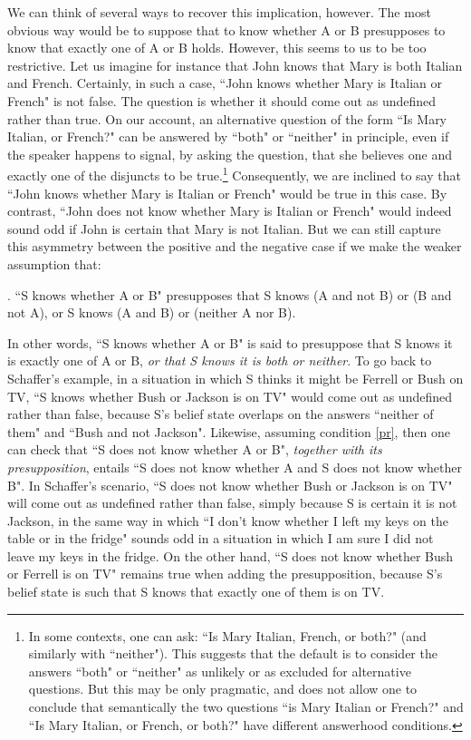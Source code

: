 We can think of several ways to recover this implication, however.
The most obvious way would be to suppose that to know whether A or
B presupposes to know that exactly one of A or B holds. However,
this seems to us to be too restrictive. Let us imagine for
instance that John knows that Mary is both Italian and French.
Certainly, in such a case, ``John knows whether Mary is Italian or
French" is not false. The question is whether it should come out
as undefined rather than true. On our account, an alternative
question of the form ``Is Mary Italian, or French?" can be
answered by ``both" or ``neither" in principle, even if the
speaker happens to signal, by asking the question, that she
believes one and exactly one of the disjuncts to be
true.\footnote{In some contexts, one can ask: ``Is Mary Italian,
French, or both?" (and similarly with ``neither"). This suggests
that the default is to consider the answers ``both" or ``neither"
as unlikely or as excluded for alternative questions. But this may
be only pragmatic, and does not allow one to conclude that
semantically the two questions ``is Mary Italian or French?" and
``Is Mary Italian, or French, or both?" have different answerhood
conditions.} Consequently, we are inclined to say that ``John
knows whether Mary is Italian or French" would be true in this
case. By contrast, ``John does not know whether Mary is Italian or
French" would indeed sound odd if John is certain that Mary is not
Italian. But we can still capture this asymmetry between the
positive and the negative case if we make the weaker assumption
that:

\ex.\label{pr} ``S knows whether A or B" presupposes that S knows
(A and not B) or (B and not A), or S knows (A and B) or (neither A
nor B).

In other words, ``S knows whether A or B" is said to presuppose
that S knows it is exactly one of A or B, \emph{or that S knows it
is both or neither}. To go back to Schaffer's example, in a
situation in which S thinks it might be Ferrell or Bush on TV, ``S
knows whether Bush or Jackson is on TV" would come out as
undefined rather than false, because S's belief state overlaps on
the answers ``neither of them" and ``Bush and not Jackson".
Likewise,  assuming condition \ref{pr}, then one can check that
``S does not know whether A or B", \emph{together with its
presupposition}, entails ``S does not know whether A and S does
not know whether B". In Schaffer's scenario, ``S does not know
whether Bush or Jackson is on TV" will come out as undefined
rather than false, simply because S is certain it is not Jackson,
in the same way in which ``I don't know whether I left my keys on
the table or in the fridge" sounds odd in a situation in which I
am sure I did not leave my keys in the fridge. On the other hand,
``S does not know whether Bush or Ferrell is on TV" remains true
when adding the presupposition, because S's belief state is such
that S knows that exactly one of them is on TV.

